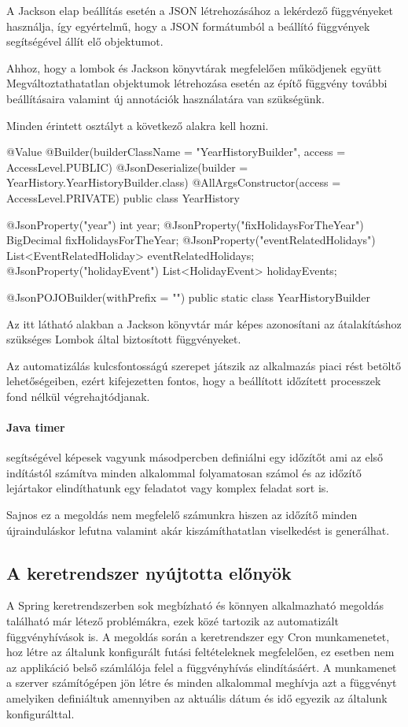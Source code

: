 A Jackson elap beállítás esetén a JSON létrehozásához a lekérdező függvényeket használja, így egyértelmű, hogy a JSON formátumból a beállító függvények segítségével állít elő objektumot.

Ahhoz, hogy a lombok és Jackson könyvtárak megfelelően működjenek együtt Megváltoztathatatlan objektumok létrehozása esetén az építő függvény további beállításaira valamint új annotációk használatára van szükségünk.

Minden érintett osztályt a következő alakra kell hozni.
\begin{java}
@Value
@Builder(builderClassName = "YearHistoryBuilder", 
access = AccessLevel.PUBLIC)
@JsonDeserialize(builder = 
YearHistory.YearHistoryBuilder.class)
@AllArgsConstructor(access = AccessLevel.PRIVATE)
public class YearHistory {
	
	@JsonProperty("year")
	int year;
	@JsonProperty("fixHolidaysForTheYear")
	BigDecimal fixHolidaysForTheYear;
	@JsonProperty("eventRelatedHolidays")
	List<EventRelatedHoliday> eventRelatedHolidays;
	@JsonProperty("holidayEvent")
	List<HolidayEvent> holidayEvents;
	
	@JsonPOJOBuilder(withPrefix = "")
	public static class YearHistoryBuilder {}
}
\end{java}  

Az itt látható alakban a Jackson könyvtár már képes azonosítani az átalakításhoz szükséges Lombok által biztosított függvényeket.


Az automatizálás kulcsfontosságú szerepet játszik az alkalmazás piaci rést betöltő lehetőségeiben, ezért kifejezetten fontos, hogy a beállított időzített processzek fond nélkül végrehajtódjanak.

\paragraph{Java timer} segítségével képesek vagyunk másodpercben definiálni egy időzítőt ami az első indítástól számítva minden alkalommal folyamatosan számol és az időzítő lejártakor elindíthatunk egy feladatot vagy komplex feladat sort is.

Sajnos ez a megoldás nem megfelelő számunkra hiszen az időzítő minden újrainduláskor lefutna valamint akár kiszámíthatatlan viselkedést is generálhat.

\subsection{A keretrendszer nyújtotta előnyök}
A Spring keretrendszerben sok megbízható és könnyen alkalmazható megoldás található már létező problémákra, ezek közé tartozik az automatizált függvényhívások is.
\vskip 0.2in
A megoldás során a keretrendszer egy Cron munkamenetet, hoz létre az általunk konfigurált futási feltételeknek megfelelően, ez esetben nem az applikáció belső számlálója felel a függvényhívás elindításáért. A munkamenet a szerver számítógépen jön létre és minden alkalommal meghívja azt a függvényt amelyiken definiáltuk amennyiben az aktuális dátum és idő egyezik az általunk konfigurálttal.


